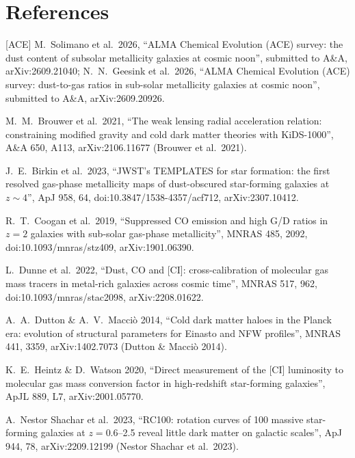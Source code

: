 \documentclass[10pt]{article}
\begin{document}
\section*{References}
\small
[ACE] M.~Solimano et al.\ 2026, ``ALMA Chemical Evolution (ACE) survey: the dust content of subsolar metallicity galaxies at cosmic noon'', submitted to A\&A, arXiv:2609.21040; N.~N.~Geesink et al.\ 2026, ``ALMA Chemical Evolution (ACE) survey: dust-to-gas ratios in sub-solar metallicity galaxies at cosmic noon'', submitted to A\&A, arXiv:2609.20926.\par
[B21] M.~M.~Brouwer et al.\ 2021, ``The weak lensing radial acceleration relation: constraining modified gravity and cold dark matter theories with KiDS-1000'', A\&A 650, A113, arXiv:2106.11677 (Brouwer et al.\ 2021).\par
[B23] J.~E.~Birkin et al.\ 2023, ``JWST's TEMPLATES for star formation: the first resolved gas-phase metallicity maps of dust-obscured star-forming galaxies at $z\sim4$'', ApJ 958, 64, doi:10.3847/1538-4357/acf712, arXiv:2307.10412.\par
[C19] R.~T.~Coogan et al.\ 2019, ``Suppressed CO emission and high G/D ratios in $z=2$ galaxies with sub-solar gas-phase metallicity'', MNRAS 485, 2092, doi:10.1093/mnras/stz409, arXiv:1901.06390.\par
[D22] L.~Dunne et al.\ 2022, ``Dust, CO and [CI]: cross-calibration of molecular gas mass tracers in metal-rich galaxies across cosmic time'', MNRAS 517, 962, doi:10.1093/mnras/stac2098, arXiv:2208.01622.\par
[DM14] A.~A.~Dutton \& A.~V.~Macci\`o 2014, ``Cold dark matter haloes in the Planck era: evolution of structural parameters for Einasto and NFW profiles'', MNRAS 441, 3359, arXiv:1402.7073 (Dutton \& Macci\`o 2014).\par
[HW20] K.~E.~Heintz \& D.~Watson 2020, ``Direct measurement of the [CI] luminosity to molecular gas mass conversion factor in high-redshift star-forming galaxies'', ApJL 889, L7, arXiv:2001.05770.\par
[NS23] A.~Nestor Shachar et al.\ 2023, ``RC100: rotation curves of 100 massive star-forming galaxies at $z=0.6$--2.5 reveal little dark matter on galactic scales'', ApJ 944, 78, arXiv:2209.12199 (Nestor Shachar et al.\ 2023).\par
\end{document}
